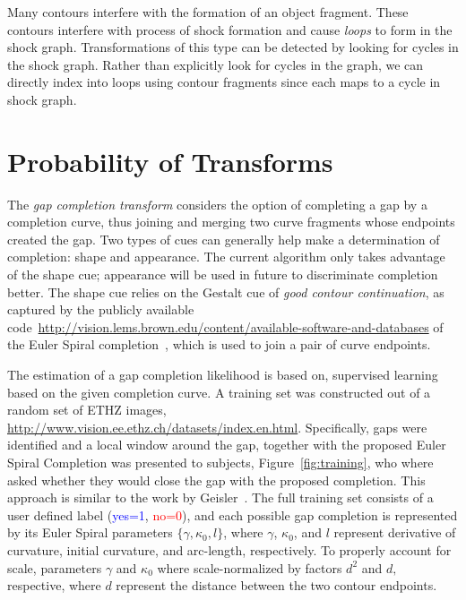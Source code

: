 \documentclass[runningheads,a4paper]{llncs}
\begin{document}
Many contours interfere with the formation of an object fragment. These contours interfere with process of shock formation and cause {\em loops} to form in the shock graph. Transformations of this type can be detected by looking for cycles in the shock graph. Rather than explicitly look for cycles in the graph, we can directly index into loops using contour fragments since each maps to a cycle in shock graph. 




\section{Probability of Transforms}
\label{sec:prob_transform}

The {\it gap completion transform} considers the option of completing a gap by a completion curve, thus joining and merging  two  curve fragments whose endpoints created the gap. Two types of cues can generally help make a determination of completion: shape and appearance. The current algorithm only takes advantage of the shape cue; appearance will be used in future
to discriminate completion better. The shape cue relies on the Gestalt cue of {\em good contour continuation}, as captured by the publicly available
code~\url{http://vision.lems.brown.edu/content/available-software-and-databases} of the Euler Spiral completion~\cite{Kimia:Euler:Spiral:IJCV03}, which is
used to join a pair of curve endpoints. 

The estimation of a gap completion likelihood is based on, supervised learning based on the given completion curve. A training set was constructed out of a random set of ETHZ images,
\url{http://www.vision.ee.ethz.ch/datasets/index.en.html}.
Specifically, gaps were identified and a local window around the gap, together
with the proposed Euler Spiral Completion was presented to subjects, Figure~\ref{fig:training}, who where asked whether they would close the gap with the proposed completion.
This approach is similar to the work by Geisler~\cite{Geisler:vision:journal}. The full training set consists of a user defined label (\textcolor{blue}{yes=1}, \textcolor{red}{no=0}), and each possible gap completion is represented by its Euler Spiral parameters $\{\gamma, \kappa_0,l\}$, where $\gamma$, $\kappa_0$, and $l$ represent derivative of curvature, initial curvature, and arc-length, respectively. To properly account for scale, parameters  $\gamma$ and $\kappa_0$ where scale-normalized  by factors $d^2$ and $d,$ respective, where $d$ represent the distance between the two contour endpoints.
\end{document}
